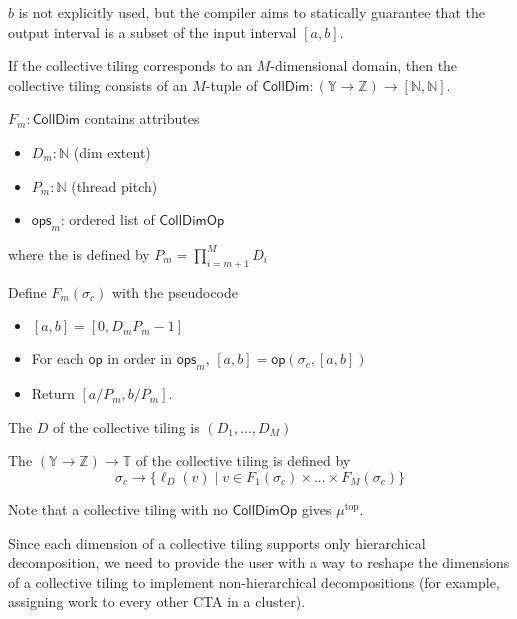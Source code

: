 \filbreak
$b$ is not explicitly used, but the compiler aims to statically guarantee that the output interval is a subset of the input interval $[a, b]$.

\filbreak
If the collective tiling corresponds to an $M$-dimensional domain, then the collective tiling consists of an $M$-tuple of $\mathsf{CollDim}: (\mathbb{Y} \to \mathbb{Z}) \to [\mathbb{N}, \mathbb{N}]$.

\filbreak
$F_m: \mathsf{CollDim}$ contains attributes
\begin{itemize}
  \item $D_m: \mathbb{N}$ (dim extent)
  \filbreak
  \item $P_m: \mathbb{N}$ (thread pitch)
  \filbreak
  \item $\mathsf{ops}_m$: ordered list of $\mathsf{CollDimOp}$
\end{itemize}
where the  is defined by $P_m = \prod_{i = m+1}^M D_i$

\filbreak
Define $F_m(\sigma_c)$ with the pseudocode
\begin{itemize}
  \item $[a, b] = [0, D_mP_m-1]$
  \item For each $\mathsf{op}$ in order in $\mathsf{ops}_m$, $[a, b] = \mathsf{op}(\sigma_c, [a, b])$
  \item Return $[a / P_m, b / P_m]$.
\end{itemize}

\filbreak
The  $D$ of the collective tiling is $(D_1, ..., D_M)$

The  $(\mathbb{Y} \to \mathbb{Z}) \to \mathbb{T}$ of the collective tiling is defined by
\begin{equation}
  \sigma_c \to \{ \ell_D(v) \mid v \in F_1(\sigma_c) \times ... \times F_M(\sigma_c) \}
\end{equation}

Note that a collective tiling with no $\mathsf{CollDimOp}$ gives $\mu^\text{top}$.

\filbreak
{}


Since each dimension of a collective tiling supports only hierarchical decomposition, we need to provide the user with a way to reshape the dimensions of a collective tiling to implement non-hierarchical decompositions
(for example, assigning work to every other CTA in a cluster).

